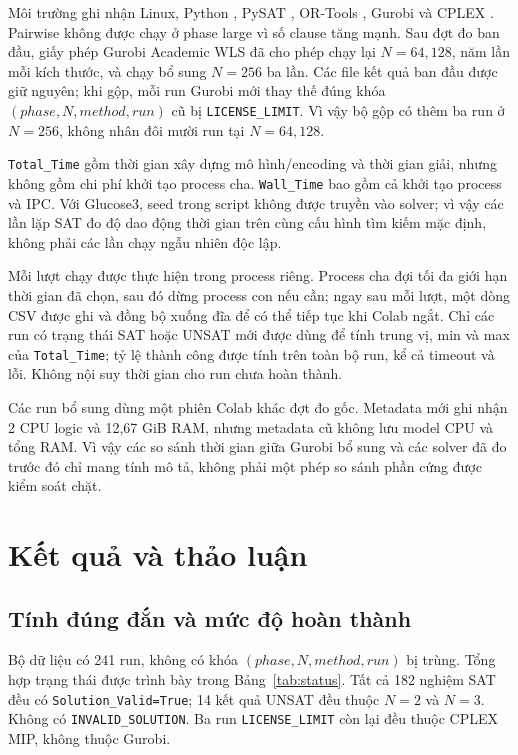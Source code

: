 \documentclass[a4paper,fleqn]{cas-sc}
\providecommand{\ReportPrefix}{}
\begin{document}
Môi trường ghi nhận Linux, Python \ResultPython{}, PySAT \ResultPySAT{},
OR-Tools \ResultORTools{}, Gurobi \ResultGurobi{} và CPLEX \ResultCPLEX{}.
Pairwise không được chạy ở phase large vì số clause tăng mạnh. Sau đợt đo
ban đầu, giấy phép Gurobi Academic WLS đã cho phép chạy lại $N=64,128$,
năm lần mỗi kích thước, và chạy bổ sung $N=256$ ba lần. Các file kết quả
ban đầu được giữ nguyên; khi gộp, mỗi run Gurobi mới thay thế đúng khóa
$(phase,N,method,run)$ cũ bị \texttt{LICENSE\_LIMIT}. Vì vậy bộ gộp có
thêm ba run ở $N=256$, không nhân đôi mười run tại $N=64,128$.

\texttt{Total\_Time} gồm thời gian xây dựng mô hình/encoding và thời gian giải,
nhưng không gồm chi phí khởi tạo process cha. \texttt{Wall\_Time} bao gồm cả
khởi tạo process và IPC. Với Glucose3, seed trong script không được truyền vào
solver; vì vậy các lần lặp SAT đo độ dao động thời gian trên cùng cấu hình tìm
kiếm mặc định, không phải các lần chạy ngẫu nhiên độc lập.

Mỗi lượt chạy được thực hiện trong process riêng. Process cha đợi tối đa
giới hạn thời gian đã chọn, sau đó dừng process con nếu cần; ngay sau mỗi
lượt, một dòng CSV được ghi và đồng bộ xuống đĩa để có thể tiếp tục khi Colab
ngắt. Chỉ các run có trạng thái SAT hoặc UNSAT mới được dùng để tính trung vị,
min và max của \texttt{Total\_Time}; tỷ lệ thành công được tính trên toàn bộ
run, kể cả timeout và lỗi. Không nội suy thời gian cho run chưa hoàn thành.

Các run bổ sung dùng một phiên Colab khác đợt đo gốc. Metadata mới ghi nhận
2 CPU logic và 12{,}67 GiB RAM, nhưng metadata cũ không lưu model CPU và
tổng RAM. Vì vậy các so sánh thời gian giữa Gurobi bổ sung và các solver đã
đo trước đó chỉ mang tính mô tả, không phải một phép so sánh phần cứng được
kiểm soát chặt.

\ifdefined\FullReport

\fi

\section{Kết quả và thảo luận}

\subsection{Tính đúng đắn và mức độ hoàn thành}

Bộ dữ liệu có 241 run, không có khóa $(phase,N,method,run)$ bị trùng. Tổng hợp
trạng thái được trình bày trong Bảng~\ref{tab:status}. Tất cả 182 nghiệm SAT
đều có \texttt{Solution\_Valid=True}; 14 kết quả UNSAT đều thuộc $N=2$ và
$N=3$. Không có \texttt{INVALID\_SOLUTION}. Ba run
\texttt{LICENSE\_LIMIT} còn lại đều thuộc CPLEX MIP, không thuộc Gurobi.
\end{document}
